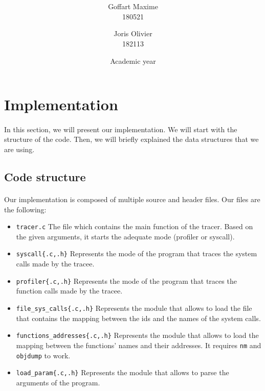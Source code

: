 \documentclass[a4paper, 11pt, oneside]{article}
\title{\ClassName\\\vspace*{0.8cm}\ProjectName\vspace{0.8cm}}
\author{Goffart Maxime \\180521 \and Joris Olivier \\ 182113}
\date{\vspace{1cm}Academic year \AcademicYear}
\begin{document}
\begin{titlingpage}
{\let\newpage\relax\maketitle}
\end{titlingpage}


\section{Implementation}
\paragraph{}In this section, we will present our implementation. We will start with the structure of the code. Then, we will briefly explained the data structures that we are using.

\subsection{Code structure}
\paragraph{}Our implementation is composed of multiple source and header files. Our files are the following:
\begin{itemize}
	\item \texttt{tracer.c} The file which contains the main function of the tracer. Based on the given arguments, it starts the adequate mode (profiler or syscall).
	\item \texttt{syscall\{.c,.h\}} Represents the mode of the program that traces the system calls made by the tracee.
	\item \texttt{profiler\{.c,.h\}} Represents the mode of the program that traces the function calls made by the tracee.
	\item \texttt{file\_sys\_calls\{.c,.h\}} Represents the module that allows to load the file that contains the mapping between the ids and the names of the system calls.
	\item \texttt{functions\_addresses\{.c,.h\}} Represents the module that allows to load the mapping between the functions' names and their addresses. It requires \texttt{nm} and \texttt{objdump} to work.
	\item \texttt{load\_param\{.c,.h\}} Represents the module that allows to parse the arguments of the program.
\end{itemize}
\end{document}
